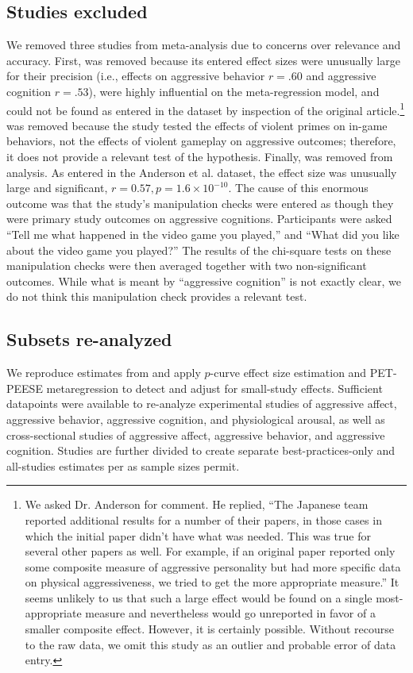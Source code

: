 \documentclass[man]{apa6}
\begin{document}
\subsection{Studies excluded}
We removed three studies from meta-analysis due to concerns over relevance and accuracy. First, \citet[study 1]{Matsuzaki:etal:2004} was removed because its entered effect sizes were unusually large for their precision (i.e., effects on aggressive behavior $r = .60$ and aggressive cognition $r = .53$), were highly influential on the meta-regression model, and could not be found as entered in the \citet{Anderson:etal:2010} dataset by inspection of the original article.\footnote{We asked Dr. Anderson for comment. He replied, ``The Japanese team reported additional results for a number of their papers, in those cases in which the initial paper didn't have what was needed. This was true for several other papers as well. For example, if an original paper reported only some composite measure of aggressive personality but had more specific data on physical aggressiveness, we tried to get the more appropriate measure.'' It seems unlikely to us that such a large effect would be found on a single most-appropriate measure and nevertheless would go unreported in favor of a smaller composite effect. However, it is certainly possible. Without recourse to the raw data, we omit this study as an outlier and probable error of data entry.}
\citet{Panee:Ballard:2002} was removed because the study tested the effects of violent primes on in-game behaviors, not the effects of violent gameplay on aggressive outcomes; therefore, it does not provide a relevant test of the hypothesis. 
Finally, \citet{Graybill:etal:1985} was removed from analysis. As entered in the Anderson et al. dataset, the effect size was unusually large and significant, $r = 0.57, p = 1.6 \times 10^{-10}$. The cause of this enormous outcome was that the study's manipulation checks were entered as though they were primary study outcomes on aggressive cognitions. Participants were asked ``Tell me what happened in the video game you played,'' and ``What did you like about the video game you played?'' The results of the chi-square tests on these manipulation checks were then averaged together with two non-significant outcomes. While what is meant by ``aggressive cognition'' is not exactly clear, we do not think this manipulation check provides a relevant test.

\subsection{Subsets re-analyzed}
We reproduce estimates from \citet{Anderson:etal:2010} and apply $p$-curve effect size estimation and PET-PEESE metaregression to detect and adjust for small-study effects. Sufficient datapoints were available to re-analyze experimental studies of aggressive affect, aggressive behavior, aggressive cognition, and physiological arousal, as well as cross-sectional studies of aggressive affect, aggressive behavior, and aggressive cognition. Studies are further divided to create separate best-practices-only and all-studies estimates per \citet{Anderson:etal:2010} as sample sizes permit. 
\end{document}
